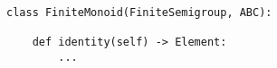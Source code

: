 \begin{verbatim}
class FiniteMonoid(FiniteSemigroup, ABC):

    def identity(self) -> Element:
        ...
\end{verbatim}